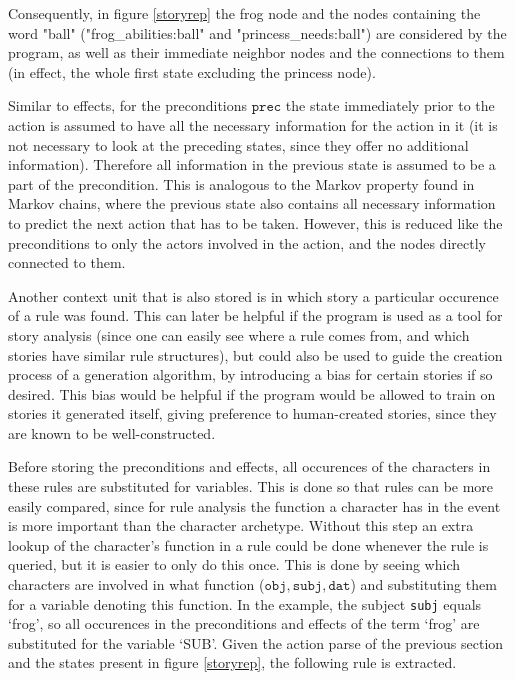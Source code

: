 Consequently, in figure \ref{storyrep} the frog node and the nodes containing the word
"ball" ("frog\_abilities:ball" and "princess\_needs:ball") are considered by the
program, as
well as their immediate neighbor nodes and the connections to them (in effect,
the whole first state excluding the princess node).

Similar to effects, for the preconditions $\texttt{prec}$ the state immediately prior to the action
is assumed to have all the
necessary information for the action in it (it is not necessary to look at the 
preceding states, since they offer no additional information). Therefore all
information in the previous state is assumed to be a part of the precondition.
This is analogous to the Markov property found in Markov chains, where the
previous state also contains all necessary information to predict the
next action that has to be taken.
However, this is reduced like the preconditions to only the actors involved in
the action, and the nodes directly connected to them.

Another context unit that is also stored is in which story a particular occurence of a
rule was found. This can later be helpful if the program is used as a tool for
story analysis (since one can easily see where a rule comes from, and which
stories have similar rule structures), but could also be used to guide the creation process of a
generation algorithm, by introducing a bias for certain stories if so desired.
This bias would be helpful if the program would be allowed to train on stories
it generated itself, giving preference to human-created stories, since they are
known to be well-constructed.

Before storing the preconditions and effects, all occurences of the characters
in these rules are substituted for variables.
This is
done so that rules can be more easily compared, since for rule analysis the
function a character has in the event is more important than the character
archetype. Without this step an extra
lookup of the character's function in a rule could be done whenever the rule 
is queried, but it is easier to only do this once.
This is done by seeing which
characters are involved in what function ($\texttt{obj}, \texttt{subj}, \texttt{dat}$)
and substituting them for a variable denoting this function. In the example, the
subject \texttt{subj} equals `frog', so all occurences in the preconditions and
effects of the term `frog' are substituted for the variable `SUB'.
Given the action parse of the previous section and the states present in figure
\ref{storyrep}, the following rule is extracted.

